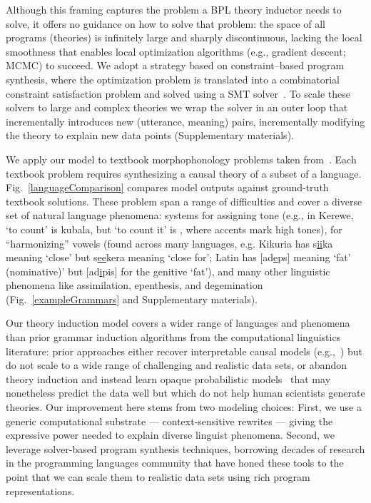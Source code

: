 \documentclass[12pt]{article}
\begin{document}
Although this framing captures the problem a BPL theory inductor needs to solve,
it offers no guidance on how to solve that problem:
the space of all programs (theories) is infinitely large and
sharply discontinuous, lacking the local smoothness that
enables local optimization algorithms (e.g., gradient descent; MCMC)
to succeed.
We adopt a strategy based on constraint--based program synthesis,
where the optimization problem is translated
into a combinatorial constraint satisfaction 
problem and solved using
a SMT solver~\cite{solar2006combinatorial}.
To scale these solvers to
large and complex theories 
we wrap the solver in
an outer loop that incrementally
introduces new (utterance, meaning) pairs,
incrementally modifying the theory to explain
new data points (Supplementary materials).

We apply our model to textbook morphophonology problems taken from~\cite{9780511808869}.
Each textbook problem requires synthesizing a
causal theory of a subset of a language.
Fig.~\ref{languageComparison}
compares model outputs against 
ground-truth textbook solutions.
These problem span a range of difficulties
and cover a diverse set of natural language phenomena:
systems for assigning tone (e.g., in Kerewe,
`to count' is kubala, but `to count it' is , where accents mark high tones),
for ``harmonizing'' vowels (found across many languages, e.g. Kikuria
has s\underline{ii}ka meaning `close' but s\underline{ee}kera meaning `close for';
Latin has [ad\underline{e}ps] meaning `fat' (nominative)' but [ad\underline{i}pis] for the genitive `fat'),
and many other linguistic phenomena like
assimilation, epenthesis, and degemination (Fig.~\ref{exampleGrammars} and Supplementary materials).

Our theory induction model covers a wider range of languages and
phenomena than prior grammar induction algorithms from the
computational linguistics literature: prior approaches either recover
interpretable causal models
(e.g.,~\cite{Albright03rulesvs,gildea1996learning,rasin2015learning})
but do not scale to a wide range of challenging and realistic data
sets, or abandon theory induction and instead learn opaque
probabilistic models~\cite{cotterell-peng-eisner-2015} that may
nonetheless predict the data well but which do not help human
scientists generate theories.  Our improvement here stems from two
modeling choices: First, we use a generic computational substrate ---
context-sensitive rewrites --- giving the expressive power needed to
explain diverse linguist phenomena.  Second, we leverage solver-based
program synthesis techniques, borrowing decades of
research in the programming languages community that have honed these
tools to the point that we can scale them to
realistic data sets using rich program representations.
\end{document}
